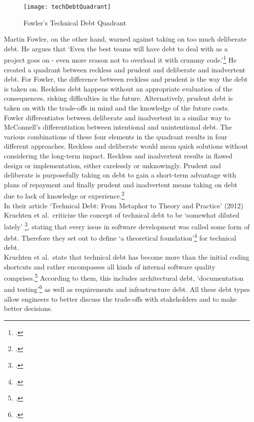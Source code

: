 \begin{figure}[H]
    \centering
    \caption[]{Fowler's Technical Debt Quadrant}
    \label{fig:technicaldebtquadrant}
    \texttt{[image: techDebtQuadrant]}
\end{figure}
Martin Fowler, on the other hand, warned against taking on too much deliberate debt. He argues that `Even the best teams will have debt to deal with as a project goes on - even more reason not to overload it with crummy code.'\footcite{fowlerTechnicalDebtQuadrant2009}
He created a quadrant between reckless and prudent and deliberate and inadvertent debt. For Fowler, the difference between reckless and prudent is the way the debt is taken on. Reckless debt happens without an appropriate evaluation of the consequences, risking difficulties in the future. Alternatively, prudent debt is taken on
with the trade-offs in mind and the knowledge of the future costs. Fowler differentiates between deliberate and inadvertent in a similar way to McConnell's differentiation between intentional and unintentional debt.
The various combinations of these four elements in the quadrant results in four different approaches. Reckless and deliberate would mean quick solutions without considering the long-term impact. Reckless and inadvertent results in flawed design or implementation, either carelessly or unknowingly. 
Prudent and deliberate is purposefully taking on debt to gain a short-term advantage with plans of repayment and finally prudent and inadvertent means taking on debt due to lack of knowledge or experience.\footcite{fowlerTechnicalDebtQuadrant2009}\\

In their article `Technical Debt: From Metaphor to Theory and Practice' (2012) Kruchten et al.\ criticize the concept of technical debt to be `somewhat diluted lately' \footcite[18]{kruchtenTechnicalDebtMetaphor2012}, stating that every issue in software development was called some form of debt. 
Therefore they set out to define `a theoretical foundation'\footcite[19]{kruchtenTechnicalDebtMetaphor2012} for technical debt.\\
Kruchten et al.\ state that technical debt has become more than the initial coding shortcuts and rather encompasses all kinds of internal software quality comprises.\footcite[19]{kruchtenTechnicalDebtMetaphor2012}
According to them, this includes architectural debt, `documentation and testing'\footcite[20]{kruchtenTechnicalDebtMetaphor2012} as well as requirements and infrastructure debt.
All these debt types allow engineers to better discuss the trade-offs with stakeholders and to make better decisions.\\

